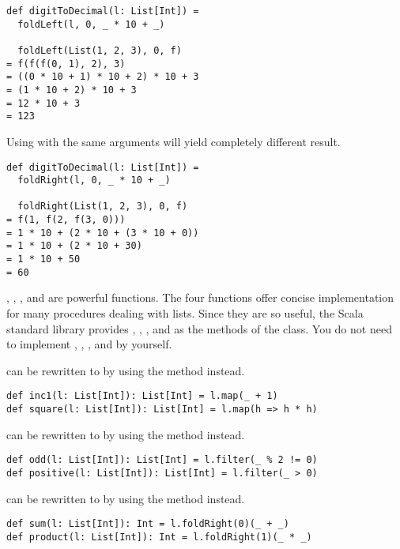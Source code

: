 \begin{verbatim}
def digitToDecimal(l: List[Int]) =
  foldLeft(l, 0, _ * 10 + _)

  foldLeft(List(1, 2, 3), 0, f)
= f(f(f(0, 1), 2), 3)
= ((0 * 10 + 1) * 10 + 2) * 10 + 3
= (1 * 10 + 2) * 10 + 3
= 12 * 10 + 3
= 123
\end{verbatim}

Using  with the same arguments will yield completely different
result.

\begin{verbatim}
def digitToDecimal(l: List[Int]) =
  foldRight(l, 0, _ * 10 + _)

  foldRight(List(1, 2, 3), 0, f)
= f(1, f(2, f(3, 0)))
= 1 * 10 + (2 * 10 + (3 * 10 + 0))
= 1 * 10 + (2 * 10 + 30)
= 1 * 10 + 50
= 60
\end{verbatim}

, , , and
 are powerful functions. The four functions offer concise
implementation for many procedures dealing with lists.
Since they are so useful, the Scala standard library provides ,
, , and  as the methods of the
 class. You do not need to implement ,
, , and  by yourself.

 can be rewritten to  by using the 
method instead.

\begin{verbatim}
def inc1(l: List[Int]): List[Int] = l.map(_ + 1)
def square(l: List[Int]): List[Int] = l.map(h => h * h)
\end{verbatim}

 can be rewritten to  by using the
 method instead.

\begin{verbatim}
def odd(l: List[Int]): List[Int] = l.filter(_ % 2 != 0)
def positive(l: List[Int]): List[Int] = l.filter(_ > 0)
\end{verbatim}

 can be rewritten to  by using the
 method instead.

\begin{verbatim}
def sum(l: List[Int]): Int = l.foldRight(0)(_ + _)
def product(l: List[Int]): Int = l.foldRight(1)(_ * _)
\end{verbatim}

